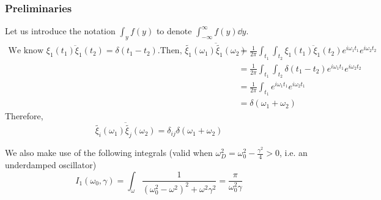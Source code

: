\documentclass[12pt, twoside]{article}
\begin{document}
\subsubsection{Preliminaries}
Let us introduce the notation $\int_{y}^{} f(y)$ to denote $\int_{-\infty}^{\infty} f(y) \dd{y}$. \\
$\begin{aligned}\text{We know } \overline{\xi_1(t_1)\xi_1(t_2)} = \delta(t_1 - t_2). \text{Then, } \overline{\widetilde{\xi_1}(\omega_1)\widetilde{\xi_1}(\omega_2)} &= \frac{1}{2\pi}\int_{t_1}\int_{t_2} \overline{\xi_1(t_1)\xi_1(t_2)} e^{i\omega_1 t_1}e^{i\omega_2 t_2} \\&= \frac{1}{2\pi}\int_{t_1}\int_{t_2} \delta(t_1-t_2) e^{i\omega_1 t_1}e^{i\omega_2 t_2} \\&= \frac{1}{2\pi}\int_{t_1} e^{i\omega_1 t_1} e^{i\omega_2 t_1} \\&= \delta(\omega_1 + \omega_2)\end{aligned}$\\
Therefore, \begin{equation}
	\overline{\widetilde{\xi_i}(\omega_1)\widetilde{\xi_j}(\omega_2)} = \delta_{ij}\delta(\omega_1 + \omega_2)
\end{equation}

We also make use of the following integrals (valid when $\omega_D ^2 = \omega_0^2 - \frac{\gamma^2}{4} > 0$, i.e. an underdamped oscillator)
\begin{equation}
	I_1(\omega_0,\gamma) = \int_{\omega} \frac{1}{(\omega_0^2 - \omega^2)^2 + \omega^2 \gamma^2} = \frac{\pi}{\omega_0^2 \gamma}
\end{equation}
\end{document}
